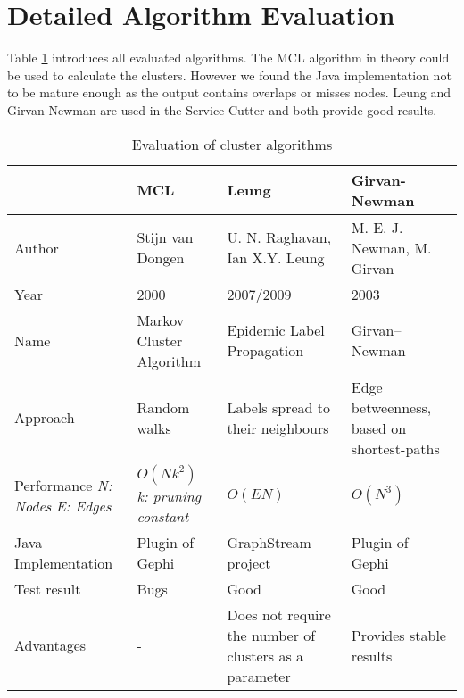 \section{Detailed Algorithm Evaluation}
\label{appendix:graphClusteringAlgs}

Table \ref{tab:clusterAlgorithms} introduces all evaluated algorithms. The \gls{MCL} algorithm in theory could be used to calculate the clusters. However we found the Java implementation not to be mature enough as the output contains overlaps or misses nodes. Leung and Girvan-Newman are used in the Service Cutter and both provide good results.

\begin{table}[H]
\centering
\caption{Evaluation of cluster algorithms}
\label{tab:clusterAlgorithms}
\begin{tabular}{|p{2cm}|p{4cm}|p{4cm}|p{4cm}|}
\hline
                    & \textbf{MCL}               & \textbf{Leung}                    & \textbf{Girvan-Newman}  \\ \hline
Author              & Stijn van Dongen\cite{markovCluster} & U. N. Raghavan\cite{raghavan}, Ian X.Y. Leung\cite{leung}    & M. E. J. Newman, M. Girvan\cite{girvan} \\ \hline
Year                & 2000                       & 2007/2009                         & \multicolumn{1}{l|}{2003}                       \\ \hline
Name                & Markov Cluster Algorithm   & Epidemic Label Propagation        & \multicolumn{1}{l|}{Girvan–Newman}              \\ \hline
Approach            & Random walks               & Labels spread to their neighbours & Edge betweenness, based on shortest-paths       \\ \hline
Performance \newline \textit{N: Nodes} \newline \textit{E: Edges}         & $O (N k^2)$ \newline \textit{k: pruning constant} \cite[p.126]{markovCluster} & $O( E N )$ \cite[p.3]{leung}                         & $O ( N^3 )$\cite[p.14]{girvan}       \\ \hline
Java Implementation & Plugin of Gephi\cite{gephiMarkov} & GraphStream project\cite{leungGraphstream} & Plugin of Gephi\cite{girvanGraphstream} \\ \hline
Test result         & Bugs                       & Good                              & \multicolumn{1}{l|}{Good}                       \\ \hline
Advantages & - & Does not require the number of clusters as a parameter & Provides stable results \\
 \hline
\end{tabular}
\end{table}
